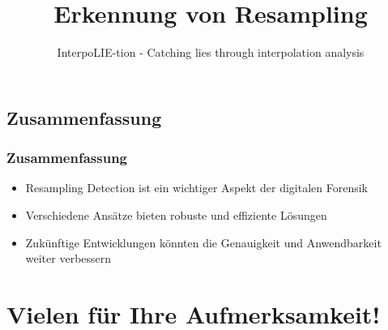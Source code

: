 \documentclass[11pt,t,usepdftitle=false,aspectratio=169]{beamer}
\begin{document}
\subsection{Zusammenfassung}

\begin{frame}
	\frametitle{Zusammenfassung}
	\begin{itemize}
		\item Resampling Detection ist ein wichtiger Aspekt der digitalen Forensik
		\item Verschiedene Ansätze bieten robuste und effiziente Lösungen
		\item Zukünftige Entwicklungen könnten die Genauigkeit und Anwendbarkeit weiter verbessern
	\end{itemize}
\end{frame}

\title[Erkennung von Resampling]{Erkennung von Resampling}
\subtitle{InterpoLIE-tion - Catching lies through interpolation analysis}
\section{Vielen für Ihre Aufmerksamkeit!}
\end{document}
